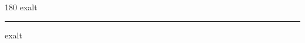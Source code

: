 
\begin{frame}
\begin{center}
\begin{turn}{180}
{\fontsize{2.5cm}{1em}\selectfont exalt}
\end{turn}
\vspace{1em}\par  
\hrule
\vspace{1em}\par  
{\fontsize{2.5cm}{1em}\selectfont exalt}
\end{center}
\end{frame}
